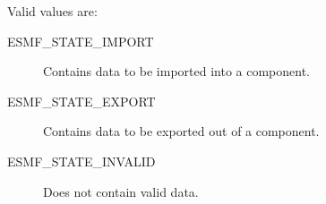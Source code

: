 Valid values are:
\begin{description}
   \item [ESMF\_STATE\_IMPORT] 
         Contains data to be imported into a component.
   \item [ESMF\_STATE\_EXPORT]
         Contains data to be exported out of a component.
   \item [ESMF\_STATE\_INVALID]
         Does not contain valid data.
\end{description}














